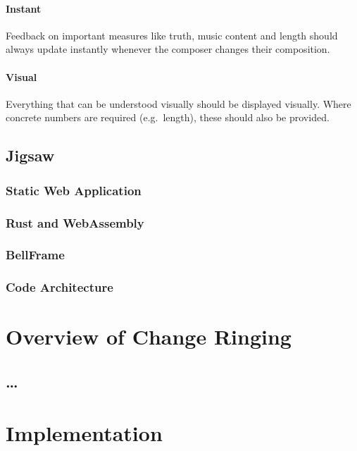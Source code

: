 \documentclass[12pt]{article}
\begin{document}
\paragraph{Instant} Feedback on important measures like truth, music content and length should
always update instantly whenever the composer changes their composition.

\paragraph{Visual} Everything that can be understood visually should be displayed visually.  Where
concrete numbers are required (e.g.\ length), these should also be provided.

\subsection{Jigsaw}

\subsubsection{Static Web Application}

\subsubsection{Rust and WebAssembly}

\subsubsection{BellFrame}

\subsubsection{Code Architecture}



\pagebreak

\section{Overview of Change Ringing}

\subsection{\ldots}



\section{Implementation}
\end{document}
